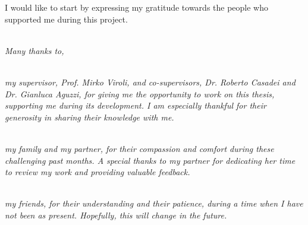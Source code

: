 
I would like to start by expressing my gratitude towards the people who
supported me during this project.

\textit{
  \\Many thanks to,
}

\textit{
  \\my supervisor, Prof. Mirko Viroli, and co-supervisors, Dr. Roberto
  Casadei and Dr. Gianluca Aguzzi, for giving me the opportunity to work on this
  thesis, supporting me during its development. I am especially thankful for
  their generosity in sharing their knowledge with me.
}

\textit{
  \\my family and my partner, for their compassion and comfort during these
  challenging past months. A special thanks to my partner for dedicating her
  time to review my work and providing valuable feedback.
}

\textit{
  \\my friends, for their understanding and their patience, during a time when
  I have not been as present. Hopefully, this will change in the future.
}
